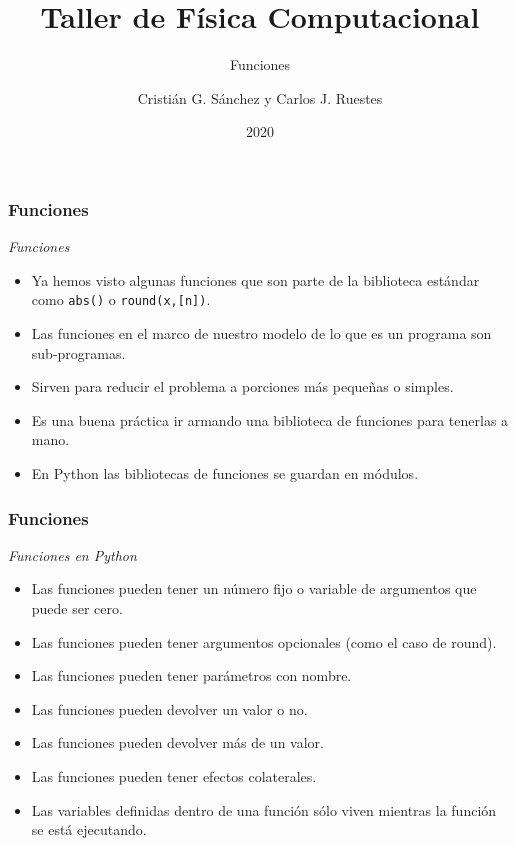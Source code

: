 \documentclass{beamer}
\title{Taller de Física Computacional}
\subtitle{Funciones}
\author{Cristián G. Sánchez y Carlos J. Ruestes}
\date{2020}
\begin{document}
\frame{\titlepage}

\begin{frame}[fragile]
\frametitle{Funciones}
\begin{block}{{\em Funciones}}
\begin{itemize}
\item Ya hemos visto algunas funciones que son parte de la biblioteca estándar como  \texttt{abs()} o \texttt{round(x,[n])}.
\item Las funciones en el marco de nuestro modelo de lo que es un programa son sub-programas.
\item Sirven para reducir el problema a porciones más pequeñas o simples.
\item Es una buena práctica ir armando una biblioteca de funciones para tenerlas a mano.
\item En Python las bibliotecas de funciones se guardan en \alert{módulos}.
\end{itemize}
\end{block}
\end{frame}

\begin{frame}[fragile]
\frametitle{Funciones}
\begin{block}{{\em Funciones en Python}}
\begin{itemize}
\item Las funciones pueden tener un número fijo o variable de argumentos que puede ser cero.
\item Las funciones pueden tener argumentos opcionales (como el caso de round).
\item Las funciones pueden tener parámetros con nombre.
\item Las funciones pueden devolver un valor o no.
\item Las funciones pueden devolver más de un valor.
\item Las funciones pueden tener \alert{efectos colaterales}.
\item Las variables definidas dentro de una función sólo viven mientras la función se está ejecutando.
\end{itemize}
\end{block}
\end{frame}
\end{document}

